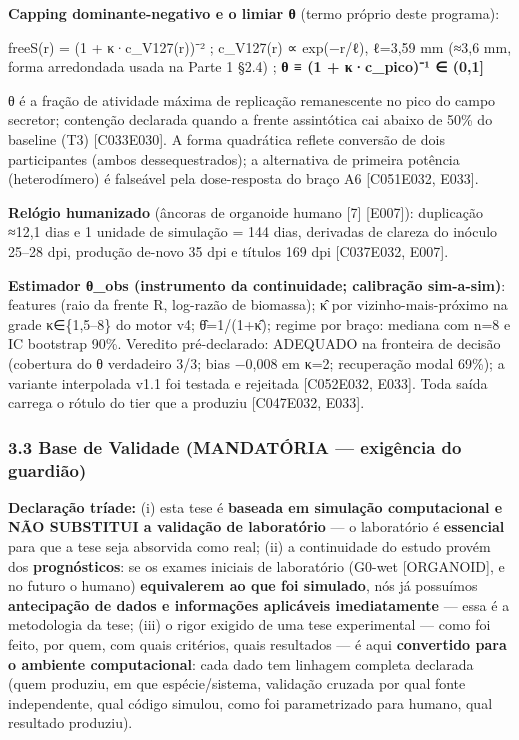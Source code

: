 \documentclass[
  10pt,
]{article}
\begin{document}
\textbf{Capping dominante-negativo e o limiar θ} (termo próprio deste
programa):

freeS(r) = (1 + κ·c\_V127(r))⁻² ; c\_V127(r) ∝ exp(−r/ℓ), ℓ=3,59 mm
(≈3,6 mm, forma arredondada usada na Parte 1 §2.4) ; \textbf{θ ≡ (1 +
κ·c\_pico)⁻¹ ∈ (0,1{]}}

θ é a fração de atividade máxima de replicação remanescente no pico do
campo secretor; contenção declarada quando a frente assintótica cai
abaixo de 50\% do baseline (T3) {[}C033\textbar E030{]}. A forma
quadrática reflete conversão de dois participantes (ambos
dessequestrados); a alternativa de primeira potência (heterodímero) é
falseável pela dose-resposta do braço A6 {[}C051\textbar E032, E033{]}.

\textbf{Relógio humanizado} (âncoras de organoide humano {[}7{]}
{[}E007{]}): duplicação ≈12,1 dias e 1 unidade de simulação = 144 dias,
derivadas de clareza do inóculo 25--28 dpi, produção de-novo 35 dpi e
títulos 169 dpi {[}C037\textbar E032, E007{]}.

\textbf{Estimador θ\_obs (instrumento da continuidade; calibração
sim-a-sim)}: features (raio da frente R, log-razão de biomassa); κ̂ por
vizinho-mais-próximo na grade κ∈\{1,5--8\} do motor v4; θ̂=1/(1+κ̂);
regime por braço: mediana com n=8 e IC bootstrap 90\%. Veredito
pré-declarado: ADEQUADO na fronteira de decisão (cobertura do θ
verdadeiro 3/3; bias −0,008 em κ=2; recuperação modal 69\%); a variante
interpolada v1.1 foi testada e rejeitada {[}C052\textbar E032, E033{]}.
Toda saída carrega o rótulo do tier que a produziu {[}C047\textbar E032,
E033{]}.

\hypertarget{base-de-validade-mandatuxf3ria-exiguxeancia-do-guardiuxe3o}{%
\subsubsection{3.3 Base de Validade (MANDATÓRIA --- exigência do
guardião)}\label{base-de-validade-mandatuxf3ria-exiguxeancia-do-guardiuxe3o}}

\textbf{Declaração tríade:} (i) esta tese é \textbf{baseada em simulação
computacional e NÃO SUBSTITUI a validação de laboratório} --- o
laboratório é \textbf{essencial} para que a tese seja absorvida como
real; (ii) a continuidade do estudo provém dos \textbf{prognósticos}: se
os exames iniciais de laboratório (G0-wet {[}ORGANOID{]}, e no futuro o
humano) \textbf{equivalerem ao que foi simulado}, nós já possuímos
\textbf{antecipação de dados e informações aplicáveis imediatamente} ---
essa é a metodologia da tese; (iii) o rigor exigido de uma tese
experimental --- como foi feito, por quem, com quais critérios, quais
resultados --- é aqui \textbf{convertido para o ambiente computacional}:
cada dado tem linhagem completa declarada (quem produziu, em que
espécie/sistema, validação cruzada por qual fonte independente, qual
código simulou, como foi parametrizado para humano, qual resultado
produziu).
\end{document}
